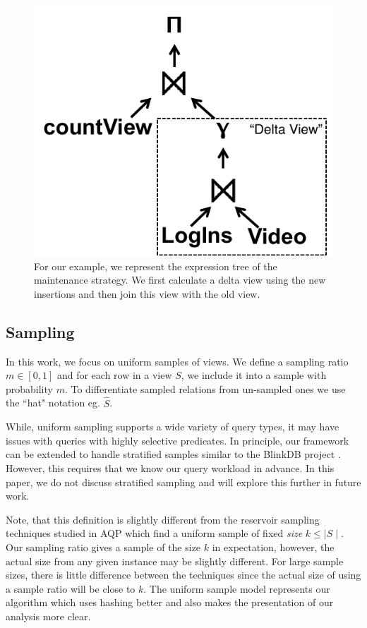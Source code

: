 \begin{figure}[t] \vspace{-2em}
\centering
 \includegraphics[scale=0.50]{figs/example_expression_tree.pdf} \vspace{-.25em}
 \caption{For our example, we represent the expression tree of the maintenance strategy. We first calculate a delta view using the new insertions and then join this view with the old view.\label{exexpr}}\vspace{-1.75em}
\end{figure}

\subsection{Sampling}
In this work, we focus on uniform samples of views.
We define a sampling ratio $m\in [0,1]$ and for each row in a view $S$, we include it into a sample with probability $m$.
To differentiate sampled relations from un-sampled ones we use the ``hat" notation eg. $\hat{S}$. 

While, uniform sampling supports a wide variety of query types, it may have issues with queries with highly selective predicates.
In principle, our framework can be extended to handle stratified samples similar to the BlinkDB project \cite{AgarwalMPMMS13}.
However, this requires that we know our query workload in advance.  
In this paper, we do not discuss stratified sampling and will explore this further in future work.

Note, that this definition is slightly different from the reservoir sampling techniques studied in AQP \cite{DBLP:journals/toms/Vitter85} which find a uniform sample of fixed \emph{size} $k\le \mid S \mid$.
Our sampling ratio gives a sample of the size $k$ in expectation, however, the actual size from any given instance may be slightly different.
For large sample sizes, there is little difference between the techniques since the actual size of using a sample ratio will be close to $k$.
The uniform sample model represents our algorithm which uses hashing better and also makes the presentation of our analysis more clear.

